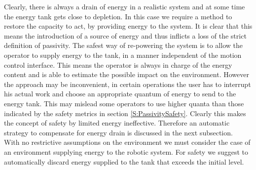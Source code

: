 \documentclass[a4paper,twoside, openright,12pt]{report}
\begin{document}
{Clearly, there is always a drain of energy in a realistic system  and at some time the energy tank gets close to depletion. In this case we require a method to restore the capacity to act, by providing energy to the system. It is clear that this means the introduction of a source of energy and thus inflicts a loss of the strict definition of passivity. The safest way of re-powering the system is to allow the operator to supply energy to the tank, in a manner independent of the motion control interface. This means the operator is always in charge of the energy content and is able to estimate the possible impact on the environment. However the approach may be inconvenient, in certain operations the user has to interrupt his actual work and choose an appropriate quantum of energy to send to the energy tank. This may mislead some operators to use higher quanta than those indicated by the safety metrics in section \ref{S:PassivitySafety}. Clearly this makes the concept of safety by limited energy ineffective. Therefore an automatic strategy to compensate for energy drain is discussed in the next subsection.\\
With no restrictive assumptions on the environment we must consider the case of an environment supplying energy to the robotic system. For safety we suggest to automatically discard energy supplied to the tank that exceeds the initial level.

}
\end{document}
